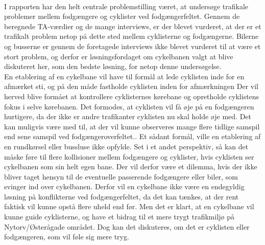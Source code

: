 ~\\
I rapporten har den helt centrale problemstilling været, at undersøge trafikale problemer mellem fodgængere og cyklister ved fodgængerfeltet. Gennem de beregnede TA-værdier og de mange interviews, er der blevet vurderet, at der er et trafikalt problem netop på dette sted mellem cyklisterne og fodgængerne. Bilerne og busserne er gennem de foretagede interviews ikke blevet vurderet til at være et stort problem, og derfor er løsningsforslaget om cykelbanen valgt at blive diskuteret her, som den bedste løsning, for netop denne undersøgelse.
~\\
En etablering af en cykelbane vil have til formål at lede cyklisten inde for en afmærket sti, og på den måde fastholde cyklisten inden for afmærkningen Der vil herved blive formået at kontrollere cyklisternes kørebane og opretholde cyklistens fokus i selve kørebanen. Det formodes, at cyklisten vil få øje på en fodgængeren hurtigere, da der ikke er andre trafikanter cyklisten nu skal holde øje med. Det kan muligvis være med til, at der vil kunne observeres mange flere tidlige samspil end sene samspil ved fodgængeroverfeltet.. Et sådant formål, ville en etablering af en rundkørsel eller bussluse ikke opfylde. Set i et andet perspektiv, så kan det måske føre til flere kollisioner mellem fodgængere og cyklister, hvis cyklisten ser cykelbanen som sin helt egen bane. Der vil derfor være et dilemma, hvis der ikke bliver taget hensyn til de eventuelle passerende fodgængere eller biler, som svinger ind over cykelbanen. Derfor vil en cykelbane ikke være en endegyldig løsning på konflikterne ved fodgængerfeltet, da det kan tænkes, at der rent faktisk vil kunne opstå flere uheld end før. Men det er klart, at en cykelbane vil kunne guide cyklisterne, og have et bidrag til et mere trygt trafikmiljø på Nytorv/Østerågade området. Dog kan det diskuteres, om det er cyklisten eller fodgængeren, som vil føle sig mere tryg.
